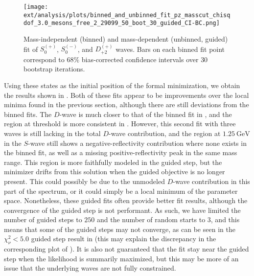 \begin{figure}
  \begin{center}
    \texttt{[image: ext/analysis/plots/binned\_and\_unbinned\_fit\_pz\_masscut\_chisqdof\_3.0\_mesons\_free\_2\_29099\_50\_boot\_30\_guided\_CI-BC.png]}
  \end{center}
  \caption{Mass-independent (binned) and mass-dependent (unbinned, guided) fit of $S_{0}^{(+)}$, $S_{0}^{(-)}$, and $D_{+2}^{(+)}$ waves. Bars on each binned fit point correspond to $68\%$ bias-corrected confidence intervals over $ 30 $ bootstrap iterations.}\label{fig:unbinned-guided-fit-chisqdof-3.0-Spn-D2p}
\end{figure}

Using these states as the initial position of the formal minimization, we obtain the results shown in . Both of these fits appear to be improvements over the local minima found in the previous section, although there are still deviations from the binned fits. The $D$-wave is much closer to that of the binned fit in , and the region at threshold is more consistent in . However, this second fit with three waves is still lacking in the total $D$-wave contribution, and the region at $\SI{1.25}{\giga\electronvolt}$ in the $S$-wave still shows a negative-reflectivity contribution where none exists in the binned fit, as well as a missing positive-reflectivity peak in the same mass range. This region is more faithfully modeled in the guided step, but the minimizer drifts from this solution when the guided objective is no longer present. This could possibly be due to the unmodeled $D$-wave contribution in this part of the spectrum, or it could simply be a local minimum of the parameter space. Nonetheless, these guided fits often provide better fit results, although the convergence of the guided step is not performant. As such, we have limited the number of guided steps to $250$ and the number of random starts to $3$, and this means that some of the guided steps may not converge, as can be seen in the $\chi^2_\nu < 5.0$ guided step result in  (this may explain the discrepancy in the corresponding plot of ). It is also not guaranteed that the fit stay near the guided step when the likelihood is summarily maximized, but this may be more of an issue that the underlying waves are not fully constrained.

